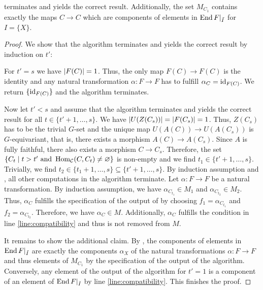 \begin{prop}
 terminates and yields the correct result. Additionally, the set $M_{C_1}$ contains exactly the maps $C \to C$ which are components of elements in $\operatorname{End}{F\vert_{\tilde I}}$ for $I = \{X\}$.
\end{prop}
\begin{proof}
We show that the algorithm terminates and yields the correct result by induction on $t'$:

For $t' = s$ we have ${\lvert F(C)\rvert} = 1$. Thus, the only map $F(C) \to F(C)$ is the identity and any natural transformation $\alpha\colon F \to F$ has to fulfill $\alpha_C = \operatorname{id}_{F(C)}$. We return $\{\operatorname{id}_{F(C)}\}$ and the algorithm terminates.

Now let $t' < s$ and assume that the algorithm terminates and yields the correct result for all $t \in \{t' + 1,\dots,s\}$. We have ${\lvert U(Z(C_s))\rvert} = {\lvert F(C_s)\rvert} = 1$. Thus, $Z(C_s)$ has to be the trivial $G$-set and the unique map $U(A(C)) \to U(A(C_s))$ is $G$-equivariant, that is, there exists a morphism $A(C) \to A(C_s)$. Since $A$ is fully faithful, there also exists a morphism $C \to C_s$. Therefore, the set $\{C_t \mid t > t'\text{ and }\operatorname{Hom}_{\mathcal{C}}(C,C_t) \neq \varnothing\}$ is non-empty and we find $t_1 \in \{t'+1,\dots,s\}$. Trivially, we find $t_2 \in \{t_1+1,\dots,s\} \subseteq \{t'+1,\dots,s\}$. By induction assumption and , all other computations in the algorithm terminate. Let $\alpha\colon F \to F$ be a natural transformation. By induction assumption, we have $\alpha_{C_{t_1}} \in M_1$ and $\alpha_{C_{t_2}} \in M_2$. Thus, $\alpha_C$ fulfills the specification of the output of  by choosing $f_1 = \alpha_{C_{t_1}}$ and $f_2 = \alpha_{C_{t_2}}$. Therefore, we have $\alpha_C \in M$. Additionally, $\alpha_C$ fulfills the condition in line \ref{line:compatibility} and thus is not removed from $M$.

It remains to show the additional claim. By , the components of elements in $\operatorname{End}{F\vert_{\tilde I}}$ are exactly the components $\alpha_X$ of the natural transformations $\alpha\colon F \to F$ and thus elements of $M_{C_1}$ by the specification of the output of the algorithm. Conversely, any element of the output of the algorithm for $t' = 1$ is a component of an element of $\operatorname{End}{F\vert_{\tilde I}}$ by line \ref{line:compatibility}. This finishes the proof.
\end{proof}

